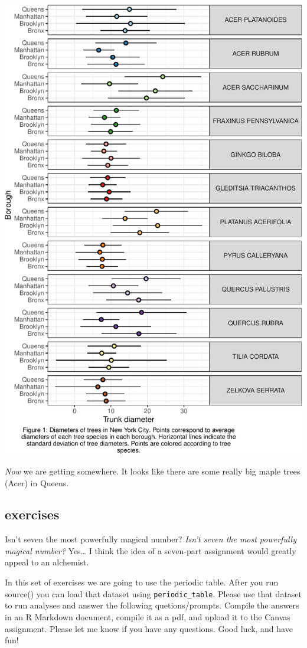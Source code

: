 \documentclass[
]{krantz}
\begin{document}
\begin{center}\includegraphics[width=0.8\linewidth]{index_files/figure-latex/unnamed-chunk-80-1} \end{center}

\emph{Now} we are getting somewhere. It looks like there are some really big maple trees (Acer) in Queens.

\hypertarget{exercises-2}{%
\subsection{exercises}\label{exercises-2}}

Isn't seven the most powerfully magical number? \emph{Isn't seven the most powerfully magical number?} Yes\ldots{} I think the idea of a seven-part assignment would greatly appeal to an alchemist.

In this set of exercises we are going to use the periodic table. After you run source() you can load that dataset using \texttt{periodic\_table}. Please use that dataset to run analyses and answer the following quetions/prompts. Compile the answers in an R Markdown document, compile it as a pdf, and upload it to the Canvas assignment. Please let me know if you have any questions. Good luck, and have fun!
\end{document}

